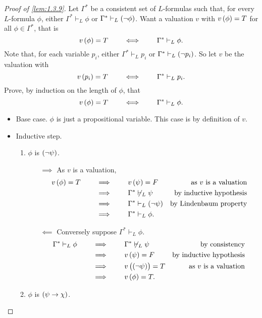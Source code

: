 \begin{proof}[Proof of \ref{lem:1.3.9}]
Let $ \Gamma^* $ be a consistent set of $ L $-formulas such that, for every $ L $-formula $ \phi $, either $ \Gamma^* \vdash_L \phi $ or $ \Gamma^* \vdash_L \notb{\phi} $. Want a valuation $ v $ with $ v\br{\phi} = T $ for all $ \phi \in \Gamma^* $, that is
$$ v\br{\phi} = T \qquad \iff \qquad \Gamma^* \vdash_L \phi. $$
Note that, for each variable $ p_i $, either $ \Gamma^* \vdash_L p_i $ or $ \Gamma^* \vdash_L \notb{p_i} $. So let $ v $ be the valuation with
$$ v\br{p_i} = T \qquad \iff \qquad \Gamma^* \vdash_L p_i. $$
Prove, by induction on the length of $ \phi $, that
$$ v\br{\phi} = T \qquad \iff \qquad \Gamma^* \vdash_L \phi. $$
\begin{itemize}
\item Base case. $ \phi $ is just a propositional variable. This case is by definition of $ v $.
\item Inductive step.
\begin{enumerate}[leftmargin=0.5in, label=Case \arabic*.]
\item $ \phi $ is $ \notb{\psi} $.
\begin{itemize}
\item[$ \implies $] As $ v $ is a valuation,
\begin{align*}
v\br{\phi} = T \qquad
& \implies \qquad v\br{\psi} = F & \text{as} \ v \ \text{is a valuation} \\
& \implies \qquad \Gamma^* \not\vdash_L \psi & \text{by inductive hypothesis} \\
& \implies \qquad \Gamma^* \vdash_L \notb{\psi} & \text{by Lindenbaum property} \\
& \implies \qquad \Gamma^* \vdash_L \phi.
\end{align*}
\item[$ \impliedby $] Conversely suppose $ \Gamma^* \vdash_L \phi $.
\begin{align*}
\Gamma^* \vdash_L \phi \qquad
& \implies \qquad \Gamma^* \not\vdash_L \psi & \text{by consistency} \\
& \implies \qquad v\br{\psi} = F & \text{by inductive hypothesis} \\
& \implies \qquad v\br{\notb{\psi}} = T & \text{as} \ v \ \text{is a valuation} \\
& \implies \qquad v\br{\phi} = T.
\end{align*}
\pagebreak
\end{itemize}
\item $ \phi $ is $ \impb{\psi}{\chi} $.
\begin{itemize}

\end{itemize}
\end{enumerate}
\end{itemize}
\end{proof}
